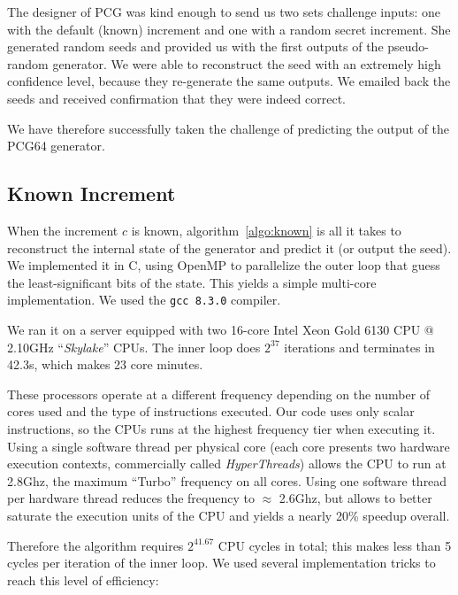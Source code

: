 \documentclass[submission,svgnames,journal=tosc]{iacrtrans}
\begin{document}
The designer of \textsf{PCG} was kind enough to send us two sets challenge
inputs: one with the default (known) increment and one with a random secret
increment. She generated random seeds and provided us with the first outputs of
the pseudo-random generator. We were able to reconstruct the seed with an
extremely high confidence level, because they re-generate the same outputs. We
emailed back the seeds and received confirmation that they were indeed correct.

We have therefore successfully taken the challenge of predicting the output of
the \textsf{PCG64} generator.

\subsection{Known Increment}

When the increment $c$ is known, algorithm~\ref{algo:known} is all it takes to
reconstruct the internal state of the generator and predict it (or output the
seed). We implemented it in \textsf{C}, using \textsf{OpenMP} to parallelize the
outer loop that guess the least-significant bits of the state. This yields a
simple multi-core implementation. We used the \texttt{gcc 8.3.0} compiler.

We ran it on a server equipped with two 16-core \textsf{Intel Xeon Gold 6130 CPU
  @ 2.10GHz} ``\emph{Skylake}'' CPUs. The inner loop does $2^{37}$ iterations
and terminates in 42.3s, which makes 23 core minutes.

These processors operate at a different frequency depending on the number of
cores used and the type of instructions executed. Our code uses only scalar
instructions, so the CPUs runs at the highest frequency tier when executing
it. Using a single software thread per physical core (each core presents two
hardware execution contexts, commercially called \emph{HyperThreads}) allows the
CPU to run at 2.8Ghz, the maximum ``Turbo'' frequency on all cores. Using one
software thread per hardware thread reduces the frequency to $\approx$ 2.6Ghz,
but allows to better saturate the execution units of the CPU and yields a nearly
20\% speedup overall.

Therefore the algorithm requires $2^{41.67}$ CPU cycles in total; this makes
less than 5 cycles per iteration of the inner loop. We used several
implementation tricks to reach this level of efficiency:
\end{document}
